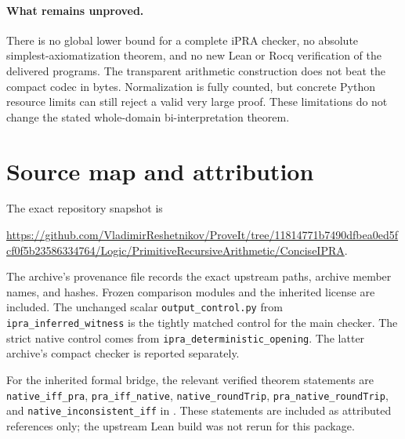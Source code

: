 \documentclass[11pt,letterpaper]{article}
\theoremstyle{definition}\newtheorem{definition}[theorem]{Definition}
\theoremstyle{remark}\newtheorem{remark}[theorem]{Remark}
\begin{document}
\paragraph{What remains unproved.}
There is no global lower bound for a complete iPRA checker, no
absolute simplest-axiomatization theorem, and no new Lean or
Rocq verification of the delivered programs. The transparent
arithmetic construction does not beat the compact codec in
bytes. Normalization is fully counted, but concrete Python
resource limits can still reject a valid very large proof.
These limitations do not change the stated whole-domain
bi-interpretation theorem.

\appendix
\section{Source map and attribution}

The exact repository snapshot is
\begin{center}\small
\url{https://github.com/VladimirReshetnikov/ProveIt/tree/11814771b7490dfbea0ed5fcf0f5b23586334764/Logic/PrimitiveRecursiveArithmetic/ConciseIPRA}.
\end{center}
The archive's provenance file records the exact upstream paths,
archive member names, and hashes. Frozen comparison modules and
the inherited license are included. The unchanged scalar
\texttt{output\_control.py} from \texttt{ipra\_inferred\_witness}
is the tightly matched control for the main checker. The strict
native control comes from \texttt{ipra\_deterministic\_opening}.
The latter archive's compact checker is reported separately.

For the inherited formal bridge, the relevant verified theorem
statements are \texttt{native\_iff\_pra},
\texttt{pra\_iff\_native}, \texttt{native\_roundTrip},
\texttt{pra\_native\_roundTrip}, and
\texttt{native\_inconsistent\_iff} in
.
These statements are included as attributed references only;
the upstream Lean build was not rerun for this package.
\end{document}
